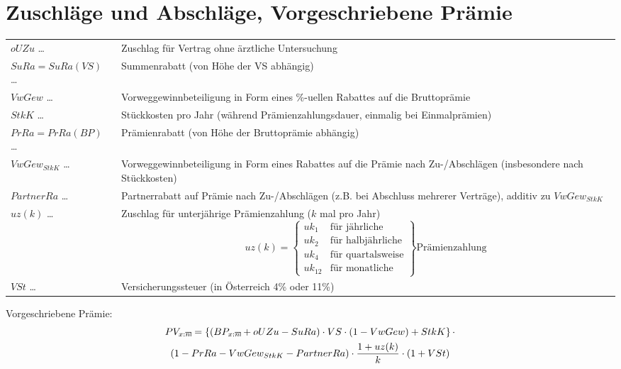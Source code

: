 \documentclass[a4paper,10pt]{article}
\makeatletter
\newcommand{\xn}{{\act[x]{n}}}
\DeclareRobustCommand{\act}[2][]{%
\def\arraystretch{0}%
\setlength\arraycolsep{0.5pt}%
\setlength\arrayrulewidth{0.5pt}%
\setbox0=\hbox{$\scriptstyle#1\ifx#1\empty{asdf}\else:\fi#2$}%
\begin{array}[b]{*2{@{}>{\scriptstyle}c}|}
\cline{2-2}%
\rule[1.25pt]{0pt}{\ht0}%
#1\ifx#1\empty\else:\fi & #2%
\end{array}%
}
\makeatother
\begin{document}
\section{Zuschläge und Abschläge, Vorgeschriebene Prämie}

\begin{longtable}{p{4cm}p{11cm}}
 $oUZu$ \dots & Zuschlag für Vertrag ohne ärztliche Untersuchung\\
 $SuRa=SuRa(VS)$ \dots & Summenrabatt (von Höhe der VS abhängig)\\
 $VwGew$ \dots & Vorweggewinnbeteiligung in Form eines \%-uellen Rabattes auf die Bruttoprämie\\
 $StkK$ \dots & Stückkosten pro Jahr (während Prämienzahlungsdauer, einmalig bei Einmalprämien)\\
 $PrRa=PrRa(BP)$ \dots & Prämienrabatt (von Höhe der Bruttoprämie abhängig)\\
 $VwGew_{StkK}$ \dots & Vorweggewinnbeteiligung in Form eines Rabattes auf die Prämie nach Zu-/Abschlägen (insbesondere nach Stückkosten)\\
 $PartnerRa$ \dots & Partnerrabatt auf Prämie nach Zu-/Abschlägen (z.B. bei Abschluss mehrerer Verträge), additiv zu $VwGew_{StkK}$\\
 
 $uz(k)$ \dots & Zuschlag für unterjährige Prämienzahlung ($k$ mal pro Jahr)
 \begin{equation*}
  uz(k)=\left.\begin{cases}uk_1 & \text {für jährliche}\\uk_2 & \text {für halbjährliche} \\ uk_4 & \text{für quartalsweise}\\uk_{12} & \text{für monatliche}\end{cases}\right\} \text{Prämienzahlung}
 \end{equation*}\\
 
 
 $VSt$ \dots & Versicherungssteuer (in Österreich 4\% oder 11\%) \\

\end{longtable}


Vorgeschriebene Prämie:
\begin{multline*}
PV_\xn = \left\{ (BP_\xn + oUZu - SuRa) \cdot VS \cdot (1-VwGew) + StkK\right\} \cdot \\ \left(1-PrRa-VwGew_{StkK}-PartnerRa\right)\cdot \frac{1+uz(k)}{k} \cdot (1+VSt)
% 
\end{multline*}
\end{document}
